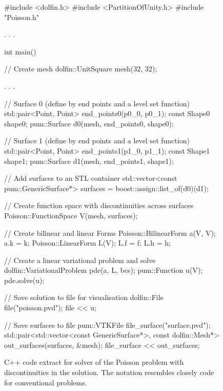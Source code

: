 \begin{figure}
\begin{c++}
#include <dolfin.h>
#include <PartitionOfUnity.h>
#include "Poisson.h"

  . . .

int main()
{
  // Create mesh
  dolfin::UnitSquare mesh(32, 32);

  . . .

  // Surface 0 (define by end points and a level set function)
  std::pair<Point, Point> end_points0(p0_0, p0_1);
  const Shape0 shape0;
  pum::Surface d0(mesh, end_points0, shape0);

  // Surface 1 (define by end points and a level set function)
  std::pair<Point, Point> end_points1(p1_0, p1_1);
  const Shape1 shape1;
  pum::Surface d1(mesh, end_points1, shape1);

  // Add surfaces to an STL container
  std::vector<const pum::GenericSurface*>
       surfaces = boost::assign::list_of(d0)(d1);

  // Create function space with discontinuities across surfaces
  Poisson::FunctionSpace V(mesh, surfaces);

  // Create bilinear and linear Forms
  Poisson::BilinearForm a(V, V);
  a.k = k;
  Poisson::LinearForm L(V);
  L.f = f; L.h = h;

  // Create a linear variational problem and solve
  dolfin::VariationalProblem pde(a, L, bcs);
  pum::Function u(V);
  pde.solve(u);

  // Save solution to file for visualisation
  dolfin::File file("poisson.pvd");
  file  << u;

  // Save surfaces to file
  pum::VTKFile file_surface("surface.pvd");
  std::pair<std::vector<const GenericSurface*>,
            const dolfin::Mesh*> out_surfaces(surfaces, &mesh);
  file_surface << out_surfaces;
}
\end{c++}
\caption{C++ code extract for solver of the Poisson problem with
discontinuities in the solution. The notation resembles closely \dolfin{}
code for conventional problems.}
\label{fig:nikbakht:poisson_c++}
\end{figure}

